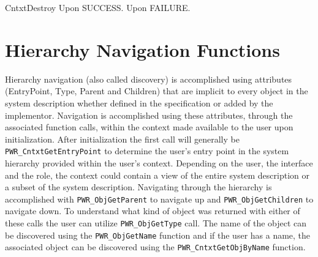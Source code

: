 \begin{prototype}{CntxtDestroy}
		{Upon SUCCESS.}
		{Upon FAILURE.}
\end{prototype}



\section{Hierarchy Navigation Functions}\label{sec:Navigation}

Hierarchy navigation (also called discovery) is accomplished using attributes (EntryPoint, Type, Parent and Children) that are implicit to every object in the system description whether defined in the specification or added by the implementor.
Navigation is accomplished using these attributes, through the associated function calls, within the context made available to the user upon initialization.
After initialization the first call will generally be \texttt{PWR_CntxtGetEntryPoint} to determine the user's entry point in the system hierarchy provided within the user's context. 
Depending on the user, the interface and the role, the context could contain a view of the entire system description or a subset of the system description.
Navigating through the hierarchy is accomplished with \texttt{PWR_ObjGetParent} to navigate up and \texttt{PWR_ObjGetChildren} to navigate down.
To understand what kind of object was returned with either of these calls the user can utilize \texttt{PWR_ObjGetType} call.
The name of the object can be discovered using the \texttt{PWR_ObjGetName} function and if the user has a name, the associated object can be discovered using the \texttt{PWR_CntxtGetObjByName} function. 

